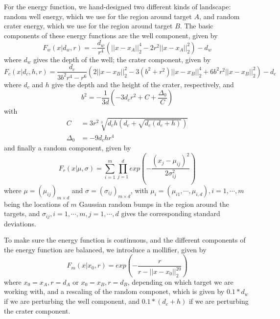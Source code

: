 \documentclass[english, aip, jcp, priprint, graphicx,floatfix]{revtex4-1}
\theoremstyle{plain}
\theoremstyle{definition}
\theoremstyle{plain}
\begin{document}
For the energy function, we hand-designed two different kinds of landscape: random well energy, which we use for the region around target $A$, and random crater energy, which we use for the region around target $B$. The basic components of these energy functions are the well component, given by
\begin{equation}
F_w(x|d_w, r) = -\frac{d_w}{r^4}(||x - x_A||_2^4 - 2r^2||x - x_A||_2^2) - d_w
\end{equation}
where $d_w$ gives the depth of the well; the crater component, given by
\begin{equation}
F_c(x|d_c, h, r) = \frac{d_c}{3b^2r^4 - r^6}(2||x - x_B||_2^2 - 3(b^2 + r^2)||x - x_B||_2^4 + 6b^2r^2||x - x_B||_2^2) - d_c
\end{equation}
where $d_c$ and $h$ give the depth and the height of the crater, respectively, and
\begin{equation}
b^2 = -\frac{1}{3d}(-3 d_c r^2 + C + \frac{\Delta_0}{C})
\end{equation}
with
\begin{align*}
C &= 3r^2 \sqrt[3]{d_c h (d_c + \sqrt{d_c (d_c + h)})} \\
\Delta_0 &= -9 d_c h r^4
\end{align*}
and finally a random component, given by
\begin{equation}
F_r(x|\mu, \sigma) = \sum_{i=1}^m\prod_{j=1}^d exp(-\frac{(x_j - \mu_{i j})^2}{2\sigma_{i j}^2})
\end{equation}
where $\mu=(\mu_{i j})_{m \times d}$ and $\sigma=(\sigma_{i j})_{m \times d}$, with $\mu_i=(\mu_{i 1}, \cdots, \mu_{i, d}), i=1, \cdots, m$ being the locations of $m$ Gaussian random bumps in the region around the targets, and $\sigma_{i j}, i=1, \cdots, m, j=1, \cdots, d$ gives the corresponding standard deviations.

To make sure the energy function is continuous, and the different components of the energy function are balanced, we introduce a mollifier, given by
\begin{equation}
F_m(x|x_0, r) = exp(-\frac{r}{r - ||x - x_0||_2^{20}})
\end{equation}
where $x_0=x_A, r=d_A$ or $x_0=x_B, r=d_B$, depending on which target we are working with, and a rescaling of the random componet, which is given by $0.1 * d_w$ if we are perturbing the well component, and $0.1 * (d_c + h)$ if we are perturbing the crater component.
\end{document}
